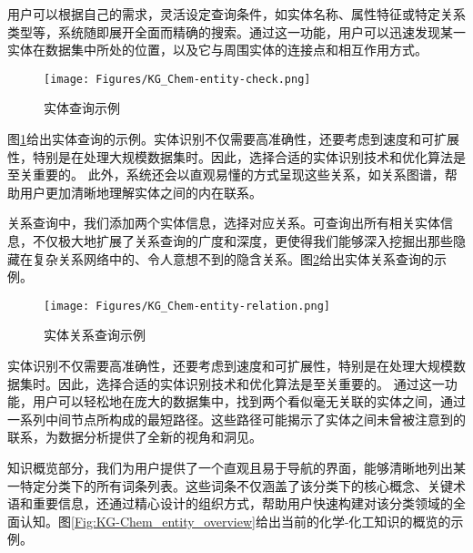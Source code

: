 用户可以根据自己的需求，灵活设定查询条件，如实体名称、属性特征或特定关系类型等，系统随即展开全面而精确的搜索。通过这一功能，用户可以迅速发现某一实体在数据集中所处的位置，以及它与周围实体的连接点和相互作用方式。

\begin{figure}[h!]
\centering
\texttt{[image: Figures/KG\_Chem-entity-check.png]}
\caption{\small\textrm{实体查询示例}}%
\label{Fig:KG-Chem_entity_check}
\end{figure}
图\ref{Fig:KG-Chem_entity_check}给出实体查询的示例。实体识别不仅需要高准确性，还要考虑到速度和可扩展性，特别是在处理大规模数据集时。因此，选择合适的实体识别技术和优化算法是至关重要的。
此外，系统还会以直观易懂的方式呈现这些关系，如关系图谱，帮助用户更加清晰地理解实体之间的内在联系。

关系查询中，我们添加两个实体信息，选择对应关系。可查询出所有相关实体信息，不仅极大地扩展了关系查询的广度和深度，更使得我们能够深入挖掘出那些隐藏在复杂关系网络中的、令人意想不到的隐含关系。图\ref{Fig:KG-Chem_entity_relation}给出实体关系查询的示例。

\begin{figure}[h!]
\centering
\texttt{[image: Figures/KG\_Chem-entity-relation.png]}
\caption{\small\textrm{实体关系查询示例}}%
\label{Fig:KG-Chem_entity_relation}
\end{figure}
实体识别不仅需要高准确性，还要考虑到速度和可扩展性，特别是在处理大规模数据集时。因此，选择合适的实体识别技术和优化算法是至关重要的。
通过这一功能，用户可以轻松地在庞大的数据集中，找到两个看似毫无关联的实体之间，通过一系列中间节点所构成的最短路径。这些路径可能揭示了实体之间未曾被注意到的联系，为数据分析提供了全新的视角和洞见。

知识概览部分，我们为用户提供了一个直观且易于导航的界面，能够清晰地列出某一特定分类下的所有词条列表。这些词条不仅涵盖了该分类下的核心概念、关键术语和重要信息，还通过精心设计的组织方式，帮助用户快速构建对该分类领域的全面认知。图\ref{Fig:KG-Chem_entity_overview}给出当前的化学-化工知识的概览的示例。

